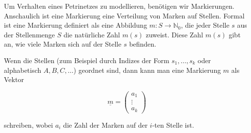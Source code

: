 
Um Verhalten eines Petrinetzes zu modellieren, benötigen wir Markierungen. Anschaulich ist eine Markierung eine Verteilung von Marken auf Stellen. Formal ist eine Markierung definiert als eine Abbildung $m: S \rightarrow \mathbb{N}_0$, die jeder Stelle $ s $ aus der Stellenmenge $S$ die natürliche Zahl $ m(s) $ zuweist. Diese Zahl $ m(s) $ gibt an, wie viele Marken sich auf der Stelle $ s $ befinden.

Wenn die Stellen (zum Beispiel durch Indizes der Form $ s_1, \ldots, s_k$ oder alphabetisch $A, B, C, \ldots$) geordnet sind, dann kann man eine Markierung $m$ als Vektor

$$ \underline{m} =
\begin{pmatrix}
	a_1 \\ \vdots \\ a_k
\end{pmatrix}
$$

schreiben, wobei $a_i$ die Zahl der Marken auf der $i$-ten Stelle ist.

